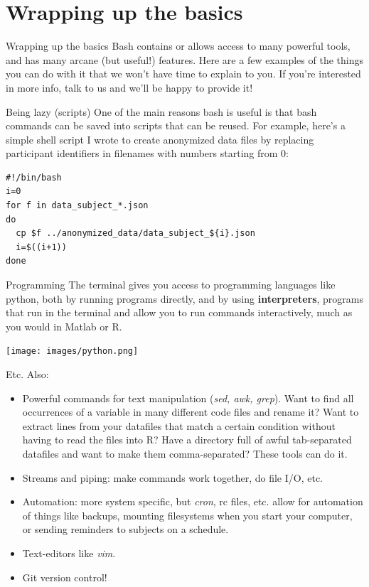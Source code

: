 \documentclass{beamer}
\begin{document}
\section{Wrapping up the basics}

\begin{frame}{Wrapping up the basics}
Bash contains or allows access to many powerful tools, and has many arcane (but useful!) features. Here are a few examples of the things you can do with it that we won't have time to explain to you. If you're interested in more info, talk to us and we'll be happy to provide it!
\end{frame}

\begin{frame}[fragile]{Being lazy (scripts)}
One of the main reasons bash is useful is that bash commands can be saved into scripts that can be reused. For example, here's a simple shell script I wrote to create anonymized data files by replacing participant identifiers in filenames with numbers starting from 0:
\begin{lstlisting}
#!/bin/bash
i=0
for f in data_subject_*.json
do
  cp $f ../anonymized_data/data_subject_${i}.json
  i=$((i+1))
done
\end{lstlisting}
\end{frame}

\begin{frame}{Programming}
The terminal gives you access to programming languages like python, both by running programs directly, and by using \textbf{interpreters}, programs that run in the terminal and allow you to run commands interactively, much as you would in Matlab or R.
\begin{center}
\texttt{[image: images/python.png]}
\end{center}
\end{frame}

\begin{frame}{Etc.}
Also:
\begin{itemize}
\item Powerful commands for text manipulation (\emph{sed, awk, grep}). Want to find all occurrences of a variable in many different code files and rename it? Want to extract lines from your datafiles that match a certain condition without having to read the files into R? Have a directory full of awful tab-separated datafiles and want to make them comma-separated? These tools can do it. 
\item Streams and piping: make commands work together, do file I/O, etc.   
\item Automation: more system specific, but \emph{cron}, rc files, etc. allow for automation of things like backups, mounting filesystems when you start your computer, or sending reminders to subjects on a schedule.
\item Text-editors like \emph{vim}.
\item Git version control!
\end{itemize}
\end{frame}
\end{document}
